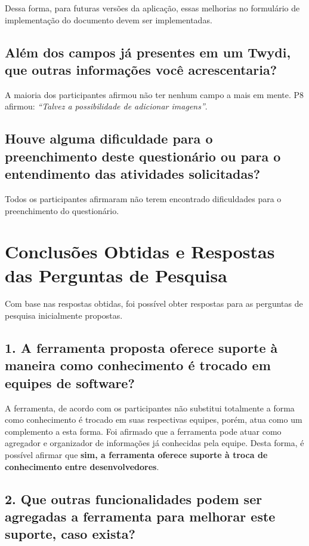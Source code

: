 Dessa forma, para futuras versões da aplicação, essas melhorias no formulário de implementação do documento devem ser implementadas.

\subsection{Além dos campos já presentes em um Twydi, que outras informações você acrescentaria?}

A maioria dos participantes afirmou não ter nenhum campo a mais em mente. P8 afirmou: \textit{``Talvez a possibilidade de adicionar imagens''}.

\subsection{Houve alguma dificuldade para o preenchimento deste questionário ou para o entendimento das atividades solicitadas?}

Todos os participantes afirmaram não terem encontrado dificuldades para o preenchimento do questionário.

\section{Conclusões Obtidas e Respostas das Perguntas de Pesquisa}

Com base nas respostas obtidas, foi possível obter respostas para as perguntas de pesquisa inicialmente propostas.

\subsection{1. A ferramenta proposta oferece suporte à maneira como conhecimento é trocado em equipes de software?}

A ferramenta, de acordo com os participantes não substitui totalmente a forma como conhecimento é trocado em suas respectivas equipes, porém, atua como um complemento a esta forma. Foi afirmado que a ferramenta pode atuar como agregador e organizador de informações já conhecidas pela equipe. Desta forma, é possível afirmar que \textbf{sim, a ferramenta oferece suporte à troca de conhecimento entre desenvolvedores}.

\subsection{2. Que outras funcionalidades podem ser agregadas a ferramenta para melhorar este suporte, caso exista?}

